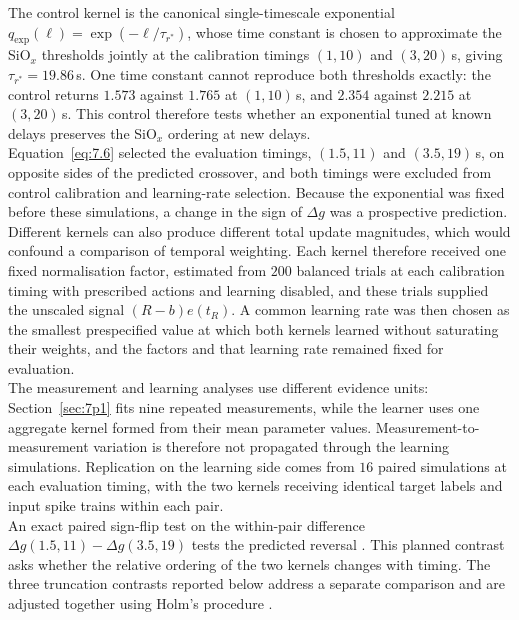 \noindent The control kernel is the canonical single-timescale exponential
$q_{\exp}(\ell)=\exp(-\ell/\tau_{r^{\ast}})$, whose time constant is chosen to approximate the
SiO$_x$ thresholds jointly at the calibration timings $(1,10)$ and $(3,20)$\,s, giving
$\tau_{r^{\ast}}=19.86$\,s. One time constant cannot reproduce both thresholds exactly: the control returns $1.573$
against $1.765$ at $(1,10)$\,s, and $2.354$ against $2.215$ at $(3,20)$\,s. This control therefore tests whether an
exponential tuned at known delays preserves the SiO$_x$ ordering at new delays.\\

\noindent Equation~\ref{eq:7.6} selected the evaluation timings, $(1.5,11)$ and $(3.5,19)$\,s, on opposite
sides of the predicted crossover, and both timings were excluded from control calibration and learning-rate selection.
Because the exponential was fixed before these simulations, a change in the sign of $\Delta g$ was a prospective
prediction.\\

\noindent Different kernels can also produce different total update magnitudes, which would confound a comparison of
temporal weighting. Each kernel therefore received one fixed normalisation factor, estimated from $200$ balanced trials
at each calibration timing with prescribed actions and learning disabled, and these trials supplied the unscaled signal
$(R-b)e(t_R)$. A common learning rate was then chosen as the smallest prespecified value at which both kernels learned
without saturating their weights, and the factors and that learning rate remained fixed for evaluation.\\

\noindent The measurement and learning analyses use different evidence units: Section~\ref{sec:7p1} fits nine repeated
measurements, while the learner uses one aggregate kernel formed from their mean parameter values.
Measurement-to-measurement variation is therefore not propagated through the learning simulations. Replication on the
learning side comes from $16$ paired simulations at each evaluation timing, with the two kernels receiving identical
target labels and input spike trains within each pair.\\

\noindent An exact paired sign-flip test on the within-pair difference
$\Delta g(1.5,11)-\Delta g(3.5,19)$ tests the predicted reversal
\cite{ernst2004permutation}. This planned contrast asks whether the relative ordering of the two kernels changes with
timing. The three truncation contrasts reported below address a separate comparison and are adjusted together using
Holm's procedure \cite{holm1979simple}.

